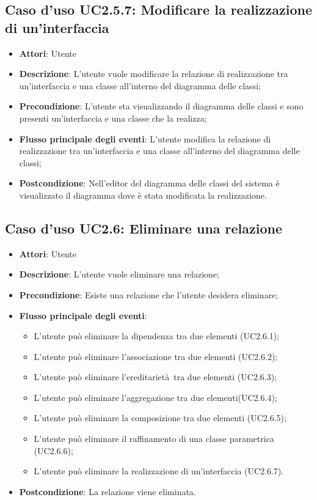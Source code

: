 \documentclass[../AnalisiDeiRequisiti.tex]{subfiles}
\begin{document}
		\subsection{Caso d'uso UC2.5.7: Modificare la realizzazione di un'interfaccia}
		\begin{itemize}
			\item \textbf{Attori}: Utente
			\item \textbf{Descrizione}: L'utente vuole modificare la relazione di realizzazione tra un'interfaccia e una classe all'interno del diagramma delle classi;
			\item \textbf{Precondizione}: L'utente sta visualizzando il diagramma delle classi e sono presenti un'interfaccia e una classe che la realizza;
			\item \textbf{Flusso principale degli eventi}: L'utente modifica la relazione di realizzazione tra un'interfaccia e una classe all'interno del diagramma delle classi;
			\item \textbf{Postcondizione}: Nell'editor del diagramma delle classi del sistema è visualizzato il diagramma dove è stata modificata la realizzazione.
		\end{itemize}
		\subsection{Caso d'uso UC2.6: Eliminare una relazione}
		\begin{itemize}
			\item \textbf{Attori}: Utente
			\item \textbf{Descrizione}: L'utente vuole eliminare una relazione;
			\item \textbf{Precondizione}: Esiste una relazione che l'utente desidera eliminare;
			\item \textbf{Flusso principale degli eventi}: \begin{itemize}
				\item L'utente può eliminare la dipendenza tra due elementi (UC2.6.1);
				\item L'utente può eliminare l'associazione tra due elementi (UC2.6.2);
				\item L'utente può eliminare l'ereditarietà tra due elementi (UC2.6.3);
				\item L'utente può eliminare l'aggregazione tra due elementi(UC2.6.4);
				\item L'utente può eliminare la composizione tra due elementi (UC2.6.5);
				\item L'utente può eliminare il raffinamento di una classe parametrica (UC2.6.6);
				\item L'utente può eliminare la realizzazione di un'interfaccia (UC2.6.7).
			\end{itemize}
			\item \textbf{Postcondizione}: La relazione viene eliminata.
		\end{itemize}
\end{document}
